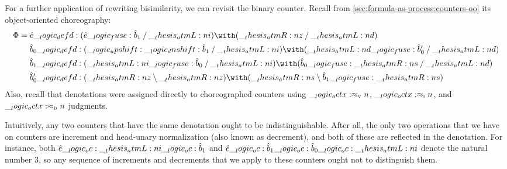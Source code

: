 For a further application of rewriting bisimilarity, we can revisit the binary counter.
Recall from \cref{sec:formula-as-process:counters-oo} its object-oriented choreography:
\begin{equation*}
  \orsig =
  \begin{lgathered}[t]
    \defp{e} \defd (\defp{e} \fuse \defp{b}_1 \pmir \atmL{i}) \with (\atmR{z} \pmir \atmL{d}) \\
    \defp{b}_0 \defd (\up \dn \defp{b}_1 \pmir \atmL{i}) \with (\atmL{d} \fuse \defp{b}'_0 \pmir \atmL{d}) \\
    \defp{b}_1 \defd (\atmL{i} \fuse \defp{b}_0 \pmir \atmL{i}) \with (\defp{b}_0 \fuse \atmR{s} \pmir \atmL{d}) \\
    \defp{b}'_0 \defd (\atmR{z} \limp \atmR{z}) \with (\atmR{s} \limp \defp{b}_1 \fuse \atmR{s})
  \end{lgathered}
\end{equation*}
Also, recall that denotations were assigned directly to choreographed counters using $\__logic_octx: \approx\sb{\text{\normalfont\scshape v}} n$, $\__logic_octx: \approx\sb{\text{\normalfont\scshape i}} n$, and $\__logic_octx: \approx\sb{\text{\normalfont\scshape d}} n$ judgments.

Intuitively, any two counters that have the same denotation ought to be indistinguishable.
After all, the only two operations that we have on counters are increment and head-unary normalization (also known as decrement), and both of these are reflected in the denotation.
For instance, both $\hat{e} \__logic_oc: \__thesis_atmL:n {i} \__logic_oc: \hat{b}_1$ and $\hat{e} \__logic_oc: \hat{b}_1 \__logic_oc: \hat{b}_0 \__logic_oc: \__thesis_atmL:n {i}$ denote the natural number $3$, so any sequence of increments and decrements that we apply to these counters ought not to distinguish them.

